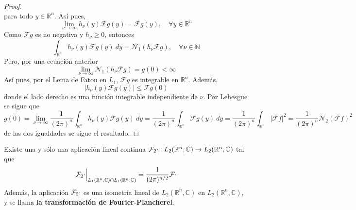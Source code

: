 \documentclass[12pt]{report}
\theoremstyle{largebreak}
\renewcommand{\leq}{\ensuremath{\leqslant}}
\renewcommand{\geq}{\ensuremath{\geqslant}}
\newcommand\abs[1]{\ensuremath{\left|#1\right|}}
\newcommand\cf[3]{\ensuremath{#1:#2\rightarrow#3}}
\newcommand{\N}[2]{\ensuremath{\mathcal{N}_{#1}\left(#2\right)}}
\newcommand{\fou}[1]{\ensuremath{\mathcal{F}#1}}
\begin{document}
\begin{proof}
\begin{equation*}
        \end{equation*}
        para todo $y\in\mathbb{R}^n$. Así pues,
        \begin{equation*}
            \lim_{\nu\rightarrow\infty}h_\nu(y)\fou{g}(y)=\fou{g}(y),\quad\forall y\in\mathbb{R}^n
        \end{equation*}
        Como $\fou{g}$ es no negativa y $h_\nu\geq0$, entonces
        \begin{equation*}
            \int_{\mathbb{R}^n}h_\nu(y)\fou{g}(y)\:dy=\N{1}{h_\nu\fou{g}},\quad\forall \nu\in\mathbb{N}
        \end{equation*}
        Pero, por una ecuación anterior
        \begin{equation*}
            \lim_{\nu\rightarrow\infty}\N{1}{h_\nu\fou{g}}=g(0)<\infty
        \end{equation*}
        Así pues, por el Lema de Fatou en $L_1$, $\fou{g}$ es integrable en $\mathbb{R}^n$. Además,
        \begin{equation*}
            \abs{h_\nu(y)\fou{g}(y)}\leq\fou{g}(0)
        \end{equation*}
        donde el lado derecho es una función integrable independiente de $\nu$. Por Lebesgue se sigue que
        \begin{equation*}
            g(0)=\lim_{\nu\rightarrow\infty}\frac{1}{(2\pi)^n}\int_{\mathbb{R}^n}h_\nu(y)\fou{g}(y)\:dy=\frac{1}{(2\pi)^n}\int_{\mathbb{R}^n}\fou{g}(y)\:dy=\frac{1}{(2\pi)^n}\int_{\mathbb{R}^n}\abs{\fou{f}}^2=\frac{1}{(2\pi)^n}\N{2}{\fou{f}}^2
        \end{equation*}
        de las dos igualdades se sigue el resultado.
    \end{proof}

    \begin{theor}
        Existe una y sólo una aplicación lineal continua $\cf{\fou_2{\cdot}}{L_2(\mathbb{R}^n,\mathbb{C})}{L_2(\mathbb{R}^n,\mathbb{C})}$ tal que
        \begin{equation*}
            \fou_2{\cdot}\Big|_{L_1(\mathbb{R}^n,\mathbb{C})\cap L_1(\mathbb{R}^n,\mathbb{C})}=\frac{1}{(2\pi)^{ n/2}}\fou{\cdot}
        \end{equation*}
        Además, la aplicación $\fou_2{\cdot}$ es una isometría lineal de $L_2(\mathbb{R}^n,\mathbb{C})$ en $L_2(\mathbb{R}^n,\mathbb{C})$, y se llama \textbf{la transformación de Fourier-Plancherel}.
    \end{theor}
\end{document}
